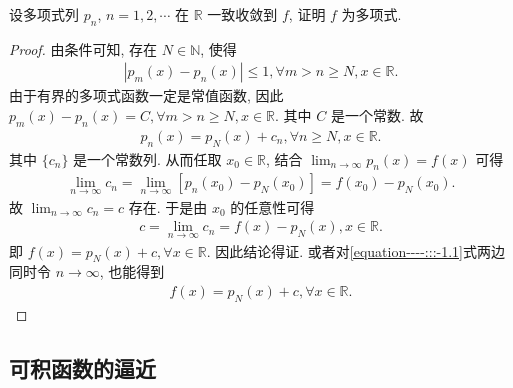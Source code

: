 \documentclass[../../main.tex]{subfiles}%
\begin{document}
\begin{example}
设多项式列 $p_n$, $n = 1,2,\cdots$ 在 $\mathbb{R}$ 一致收敛到 $f$, 证明 $f$ 为多项式. 
\end{example}
\begin{proof}

由条件可知, 存在 $N\in \mathbb{N}$, 使得
\begin{align*}
|p_m(x) - p_n(x)| \leqslant 1, \forall m > n \geqslant N, x\in \mathbb{R}.
\end{align*}
由于有界的多项式函数一定是常值函数, 因此 $p_m(x) - p_n(x) = C, \forall m > n \geqslant N, x\in \mathbb{R}$. 其中 $C$ 是一个常数. 故
\begin{align}
p_n(x) = p_N(x) + c_n, \forall n \geqslant N, x\in \mathbb{R}. \label{equation----:::-1.1}
\end{align}
其中 $\{c_n\}$ 是一个常数列. 从而任取 $x_0\in \mathbb{R}$, 结合 $\lim_{n\rightarrow \infty}p_n(x) = f(x)$ 可得
\begin{align*}
\lim_{n\rightarrow \infty}c_n = \lim_{n\rightarrow \infty}[p_n(x_0) - p_N(x_0)] = f(x_0) - p_N(x_0).
\end{align*}
故 $\lim_{n\rightarrow \infty}c_n = c$ 存在. 于是由 $x_0$ 的任意性可得
\begin{align*}
c = \lim_{n\rightarrow \infty}c_n = f(x) - p_N(x), x\in \mathbb{R}.
\end{align*}
即 $f(x) = p_N(x) + c, \forall x\in \mathbb{R}$. 因此结论得证.
或者对\eqref{equation----:::-1.1}式两边同时令 $n\rightarrow \infty$, 也能得到
\begin{align*}
f(x) = p_N(x) + c, \forall x\in \mathbb{R}.
\end{align*} 

\end{proof}

\subsection{可积函数的逼近}
\end{document}
